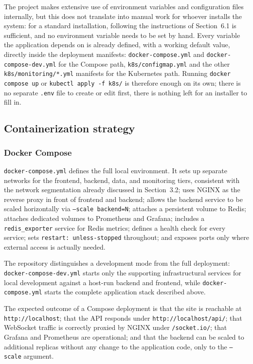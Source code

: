 \documentclass{scrartcl}
\begin{document}
The project makes extensive use of environment variables and configuration files internally, but this does not translate into manual work for whoever installs the system: for a standard installation, following the instructions of Section~6.1 is sufficient, and no environment variable needs to be set by hand. Every variable the application depends on is already defined, with a working default value, directly inside the deployment manifests: \texttt{docker-compose.yml} and \texttt{docker-compose-dev.yml} for the Compose path, \texttt{k8s/configmap.yml} and the other \texttt{k8s/monitoring/*.yml} manifests for the Kubernetes path. Running \texttt{docker compose up} or \texttt{kubectl apply -f k8s/} is therefore enough on its own; there is no separate \texttt{.env} file to create or edit first, there is nothing left for an installer to fill in.

\subsection{Containerization strategy}

\subsubsection{Docker Compose}

\texttt{docker-compose.yml} defines the full local environment. It sets up separate networks for the frontend, backend, data, and monitoring tiers, consistent with the network segmentation already discussed in Section~3.2; uses NGINX as the reverse proxy in front of frontend and backend; allows the backend service to be scaled horizontally via \texttt{--scale backend=N}; attaches a persistent volume to Redis; attaches dedicated volumes to Prometheus and Grafana; includes a \texttt{redis\_exporter} service for Redis metrics; defines a health check for every service; sets \texttt{restart: unless-stopped} throughout; and exposes ports only where external access is actually needed.

The repository distinguishes a development mode from the full deployment: \texttt{docker-compose-dev.yml} starts only the supporting infrastructural services for local development against a host-run backend and frontend, while \texttt{docker-compose.yml} starts the complete application stack described above.

The expected outcome of a Compose deployment is that the site is reachable at \texttt{http://localhost}; that the API responds under \texttt{http://localhost/api/}; that WebSocket traffic is correctly proxied by NGINX under \texttt{/socket.io/}; that Grafana and Prometheus are operational; and that the backend can be scaled to additional replicas without any change to the application code, only to the \texttt{--scale} argument.
\end{document}
